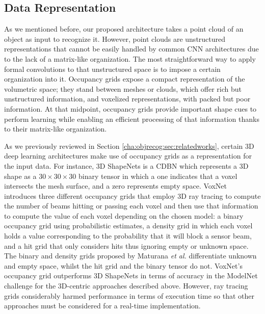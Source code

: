 \subsection{Data Representation}
\label{cha:objrecog:sec:pointnet:subsec:data}

As we mentioned before, our proposed architecture takes a point cloud of an object as input to recognize it. However, point clouds are unstructured representations that cannot be easily handled by common \ac{CNN} architectures due to the lack of a matrix-like organization. The most straightforward way to apply formal convolutions to that unstructured space is to impose a certain organization into it. Occupancy grids expose a compact representation of the volumetric space; they stand between meshes or clouds, which offer rich but unstructured information, and voxelized representations, with packed but poor information. At that midpoint, occupancy grids provide important shape cues to perform learning while enabling an efficient processing of that information thanks to their matrix-like organization.

As we previously reviewed in Section \ref{cha:objrecog:sec:relatedworks}, certain 3D deep learning architectures make use of occupancy grids as a representation for the input data. For instance, 3D ShapeNets \cite{Wu2015} is a \ac{CDBN} which represents a 3D shape as a $30 \times 30 \times 30$ binary tensor in which a one indicates that a voxel intersects the mesh surface, and a zero represents empty space. VoxNet \cite{Maturana2015} introduces three different occupancy grids that employ 3D ray tracing to compute the number of beams hitting or passing each voxel and then use that information to compute the value of each voxel depending on the chosen model: a binary occupancy grid using probabilistic estimates, a density grid in which each voxel holds a value corresponding to the probability that it will block a sensor beam, and a hit grid that only considers hits thus ignoring empty or unknown space. The binary and density grids proposed by Maturana \emph{et al.} \cite{Maturana2015} differentiate unknown and empty space, whilst the hit grid and the binary tensor do not. VoxNet's occupancy grid outperforms 3D ShapeNets in terms of accuracy in the ModelNet challenge for the 3D-centric approaches described above. However, ray tracing grids considerably harmed performance in terms of execution time so that other approaches must be considered for a real-time implementation.

